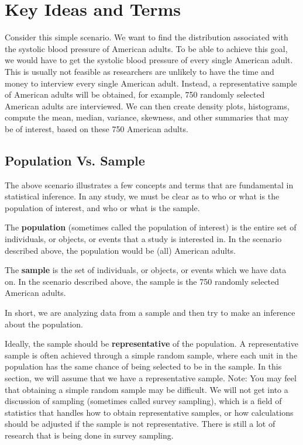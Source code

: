 \documentclass[
]{book}
\theoremstyle{definition}
\theoremstyle{definition}
\theoremstyle{definition}
\theoremstyle{definition}
\theoremstyle{remark}
\begin{document}
\hypertarget{key-ideas-and-terms}{%
\section{Key Ideas and Terms}\label{key-ideas-and-terms}}

Consider this simple scenario. We want to find the distribution associated with the systolic blood pressure of American adults. To be able to achieve this goal, we would have to get the systolic blood pressure of every single American adult. This is usually not feasible as researchers are unlikely to have the time and money to interview every single American adult. Instead, a representative sample of American adults will be obtained, for example, 750 randomly selected American adults are interviewed. We can then create density plots, histograms, compute the mean, median, variance, skewness, and other summaries that may be of interest, based on these 750 American adults.

\hypertarget{population-vs.-sample}{%
\subsection{Population Vs. Sample}\label{population-vs.-sample}}

The above scenario illustrates a few concepts and terms that are fundamental in statistical inference. In any study, we must be clear as to who or what is the population of interest, and who or what is the sample.

The \textbf{population} (sometimes called the population of interest) is the entire set of individuals, or objects, or events that a study is interested in. In the scenario described above, the population would be (all) American adults.

The \textbf{sample} is the set of individuals, or objects, or events which we have data on. In the scenario described above, the sample is the 750 randomly selected American adults.

In short, we are analyzing data from a sample and then try to make an inference about the population.

Ideally, the sample should be \textbf{representative} of the population. A representative sample is often achieved through a simple random sample, where each unit in the population has the same chance of being selected to be in the sample. In this section, we will assume that we have a representative sample. Note: You may feel that obtaining a simple random sample may be difficult. We will not get into a discussion of sampling (sometimes called survey sampling), which is a field of statistics that handles how to obtain representative samples, or how calculations should be adjusted if the sample is not representative. There is still a lot of research that is being done in survey sampling.
\end{document}
